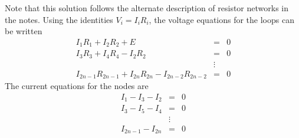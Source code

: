 
\vspace{2mm}
Note that this solution follows the alternate description of resistor 
networks in the notes. 
Using the identities $V_i=I_iR_i$, the voltage equations for the loops 
can be written
\begin{eqnarray*}
I_1R_1 + I_2R_2 + E &= &0 \\
I_3R_3 + I_4R_4 - I_2R_2 &= & 0 \\
&\vdots &  \\
I_{2n-1}R_{2n-1} + I_{2n}R_{2n} - I_{2n-2}R_{2n-2} &= &0
\end{eqnarray*}
The current equations for the nodes are 
\begin{eqnarray*}
I_1-I_3-I_2&=&0 \\
I_3-I_5-I_4&=&0 \\
&\vdots& \\
I_{2n-1}-I_{2n}&=&0 \\
\end{eqnarray*}

